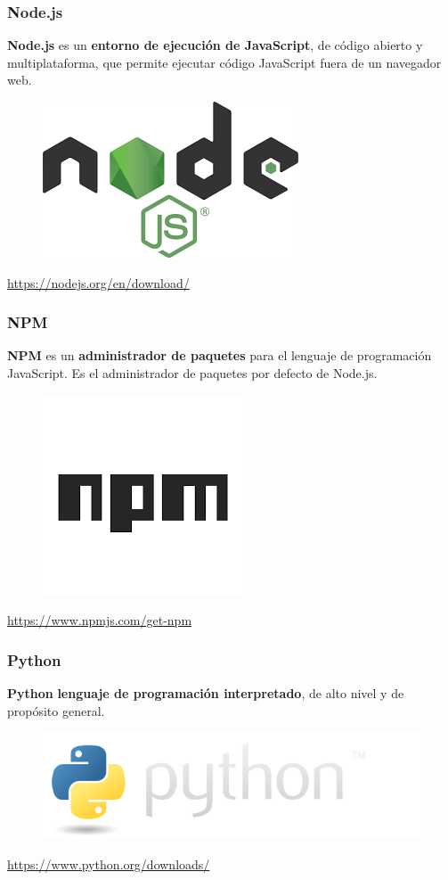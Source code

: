 \documentclass{beamer}
\begin{document}
	\begin{frame}
		\frametitle{Node.js}
		\textbf{Node.js} es un \textbf{entorno de ejecución de JavaScript}, de código abierto y multiplataforma, que permite ejecutar código JavaScript fuera de un navegador web.
		\begin{figure}[h]
			\includegraphics[scale=.3]{nodejs}
			\centering
		\end{figure}
		\begin{center}
			\tiny{\url{https://nodejs.org/en/download/}}
		\end{center}
	\end{frame}
	
	\begin{frame}
		\frametitle{NPM}
		\textbf{NPM} es un \textbf{administrador de paquetes} para el lenguaje de programación JavaScript. Es el administrador de paquetes por defecto de Node.js.
		\begin{figure}[h]
			\includegraphics[scale=.3]{npm}
			\centering
		\end{figure}
		\begin{center}
			\tiny{\url{https://www.npmjs.com/get-npm}}
		\end{center}
	\end{frame}
	
	\begin{frame}
		\frametitle{Python}
		\textbf{Python} \textbf{lenguaje de programación interpretado}, de alto nivel y de propósito general.
		\begin{figure}[h]
			\includegraphics[scale=.3]{python}
			\centering
		\end{figure}
		\begin{center}
			\tiny{\url{https://www.python.org/downloads/}}
		\end{center}
	\end{frame}
\end{document}
